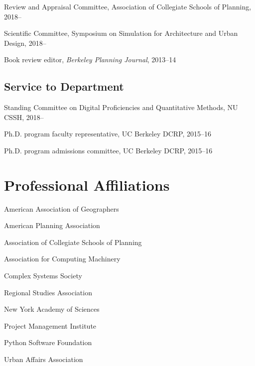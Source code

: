 \documentclass[12pt,letterpaper]{report}
\newcommand{\listitemspace}{0.15em}
\renewenvironment{itemize}
{\begin{list}{}{\setlength{\leftmargin}{0em}
			\setlength{\parskip}{0em}
			\setlength{\itemsep}{\listitemspace}
			\setlength{\parsep}{\listitemspace}}}
	{\end{list}}
\begin{document}
	\begin{itemize}
		
		\item Review and Appraisal Committee, Association of Collegiate Schools of Planning, 2018--
		
		\item Scientific Committee, Symposium on Simulation for Architecture and Urban Design, 2018--
		
		\item Book review editor, \textit{Berkeley Planning Journal}, 2013--14
		
	\end{itemize}
	
	\subsection*{Service to Department}
	
	\begin{itemize}
		
		\item Standing Committee on Digital Proficiencies and Quantitative Methods, NU CSSH, 2018--
		
		\item Ph.D. program faculty representative, UC Berkeley DCRP, 2015--16
		
		\item Ph.D. program admissions committee, UC Berkeley DCRP, 2015--16
		
	\end{itemize}
	
	
	
	\section*{Professional Affiliations}
	
	\begin{itemize}
		
		\item American Association of Geographers
		
		\item American Planning Association
		
		\item Association of Collegiate Schools of Planning
		
		\item Association for Computing Machinery
		
		\item Complex Systems Society
		
		\item Regional Studies Association
		
		\item New York Academy of Sciences
		
		\item Project Management Institute
		
		\item Python Software Foundation
		
		\item Urban Affairs Association	
		
	\end{itemize}
	
\end{document}
